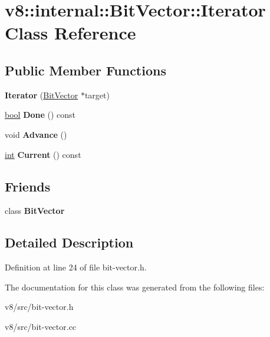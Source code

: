 \hypertarget{classv8_1_1internal_1_1BitVector_1_1Iterator}{}\section{v8\+:\+:internal\+:\+:Bit\+Vector\+:\+:Iterator Class Reference}
\label{classv8_1_1internal_1_1BitVector_1_1Iterator}
\subsection*{Public Member Functions}
\begin{DoxyCompactItemize}
\item 
\mbox{\label{classv8_1_1internal_1_1BitVector_1_1Iterator_aa6425b7c80a9d05a997574206334f2ed}} 
{\bfseries Iterator} (\mbox{\hyperlink{classv8_1_1internal_1_1BitVector}{Bit\+Vector}} $\ast$target)
\item 
\mbox{\label{classv8_1_1internal_1_1BitVector_1_1Iterator_a115adab6e08077e21e27059257bf45cb}} 
\mbox{\hyperlink{classbool}{bool}} {\bfseries Done} () const
\item 
\mbox{\label{classv8_1_1internal_1_1BitVector_1_1Iterator_a2198366b9e3be4de40d7433894ee6ab7}} 
void {\bfseries Advance} ()
\item 
\mbox{\label{classv8_1_1internal_1_1BitVector_1_1Iterator_a42b648441b9147803569ec4130d1b2ee}} 
\mbox{\hyperlink{classint}{int}} {\bfseries Current} () const
\end{DoxyCompactItemize}
\subsection*{Friends}
\begin{DoxyCompactItemize}
\item 
\mbox{\label{classv8_1_1internal_1_1BitVector_1_1Iterator_a36e8ce805d9208092c1351bd2d513e2d}} 
class {\bfseries Bit\+Vector}
\end{DoxyCompactItemize}


\subsection{Detailed Description}


Definition at line 24 of file bit-\/vector.\+h.



The documentation for this class was generated from the following files\+:\begin{DoxyCompactItemize}
\item 
v8/src/bit-\/vector.\+h\item 
v8/src/bit-\/vector.\+cc\end{DoxyCompactItemize}
